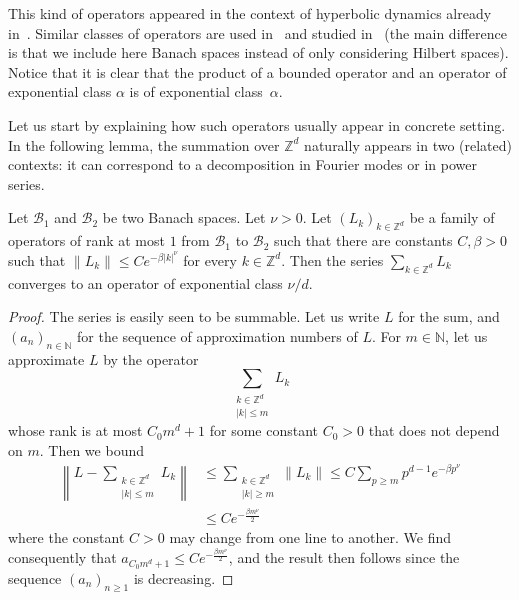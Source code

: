 \documentclass[AHL,Unicode,longabstracts,published]{cedram}
\newcommand{\n}[1]{\left\|#1\right\|}
\newcommand{\clB}{\mathcal{B}}
\newcommand{\bbZ}{\mathbb{Z}}
\newcommand{\bbN}{\mathbb{N}}
\begin{document}
This kind of operators appeared in the context of hyperbolic dynamics already in~\cite{fried_selberg,fried_zeta,rugh_correlation,ruelle_zeta_expanding}. Similar classes of operators are used in~\cite{bandtlow_naud} and studied in~\cite{bandtlow_exponential} (the main difference is that we include here Banach spaces instead of only considering Hilbert spaces). Notice that it is clear that the product of a bounded operator and an operator of exponential class $\alpha$ is of exponential class~$\alpha$.

Let us start by explaining how such operators usually appear in concrete setting. In the following lemma, the summation over $\bbZ^d$ naturally appears in two (related) contexts: it can correspond to a decomposition in Fourier modes or in power series.

\begin{lemm}\label{lemma:concrete}
Let $\clB_1$ and $\clB_2$ be two Banach spaces. Let $\nu > 0$. Let $(L_k)_{k \in \bbZ^d}$ be a family of operators of rank at most $1$ from $\clB_1$ to $\clB_2$ such that there are constants $C,\beta > 0$ such that $\n{L_k} \leq C e^{- \beta |k|^\nu}$ for every $k \in \bbZ^d$. Then the series $\sum_{k \in \bbZ^d} L_k$ converges to an operator of exponential class $\nu/d$.
\end{lemm}

\begin{proof}
The series is easily seen to be summable. Let us write $L$ for the sum, and $(a_n)_{n \in \bbN}$ for the sequence of approximation numbers of $L$. For $m \in \bbN$, let us approximate $L$ by the operator
\begin{equation*}
\sum_{\substack{k \in \bbZ^d \\ |k| \leq m}} L_k
\end{equation*}
whose rank is at most $C_0 m^d+1$ for some constant $C_0 > 0$ that does not depend on $m$. Then we bound
\begin{equation*}
\begin{split}
\n{L - \sum_{\substack{k \in \bbZ^d \\ |k| \leq m}} L_k} & \leq \sum_{\substack{k \in \bbZ^d \\ |k| \geq m}} \n{L_k} \leq C \sum_{p \geq m} p^{d-1} e^{- \beta p^\nu} \\
& \leq C e^{- \frac{\beta m^{\nu}}{2}}
\end{split}
\end{equation*}
where the constant $C > 0$ may change from one line to another. We find consequently that $a_{C_0 m^d +1} \leq C e^{- \frac{\beta m^\nu}{2}}$, and the result then follows since the sequence $(a_n)_{n \geq 1}$ is decreasing.
\end{proof}
\end{document}
